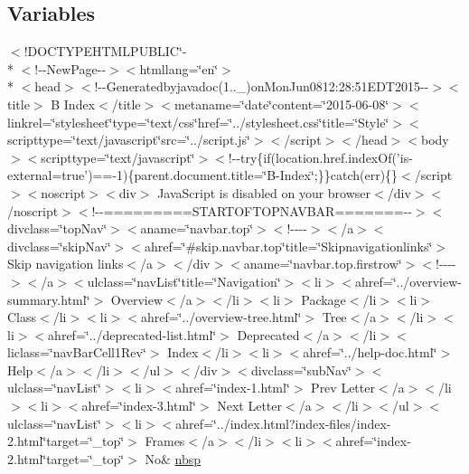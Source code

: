 \subsection*{Variables}
\begin{DoxyCompactItemize}
\item 
$<$!D\-O\-C\-T\-Y\-P\-E\-H\-T\-M\-L\-P\-U\-B\-L\-I\-C\char`\"{}-\/\\*
$<$!-\/-\/New\-Page-\/-\/$>$$<$htmllang=\char`\"{}en\char`\"{}$>$\\*
$<$head$>$$<$!-\/-\/Generatedbyjavadoc(1..\-\_)on\-Mon\-Jun0812\-:28\-:51\-E\-D\-T2015-\/-\/$>$$<$title$>$ B Index$<$/title$>$$<$metaname=\char`\"{}date\char`\"{}content=\char`\"{}2015-\/06-\/08\char`\"{}$>$$<$linkrel=\char`\"{}stylesheet\char`\"{}type=\char`\"{}text/css\char`\"{}href=\char`\"{}../stylesheet.\-css\char`\"{}title=\char`\"{}\-Style\char`\"{}$>$$<$scripttype=\char`\"{}text/javascript\char`\"{}src=\char`\"{}../script.\-js\char`\"{}$>$$<$/script$>$$<$/head$>$$<$body$>$$<$scripttype=\char`\"{}text/javascript\char`\"{}$>$$<$!-\/-\/try\{if(location.\-href.\-index\-Of('is-\/external=true')==-\/1)\{parent.\-document.\-title=\char`\"{}\-B-\/\-Index\char`\"{};\}\}catch(err)\{\}$<$/script$>$$<$noscript$>$$<$div$>$ Java\-Script is disabled on your browser$<$/div$>$$<$/noscript$>$$<$!-\/-\/=========\-S\-T\-A\-R\-T\-O\-F\-T\-O\-P\-N\-A\-V\-B\-A\-R=======-\/-\/$>$$<$divclass=\char`\"{}top\-Nav\char`\"{}$>$$<$aname=\char`\"{}navbar.\-top\char`\"{}$>$$<$!-\/-\/-\/-\/$>$$<$/a$>$$<$divclass=\char`\"{}skip\-Nav\char`\"{}$>$$<$ahref=\char`\"{}\#skip.\-navbar.\-top\char`\"{}title=\char`\"{}\-Skipnavigationlinks\char`\"{}$>$ Skip navigation links$<$/a$>$$<$/div$>$$<$aname=\char`\"{}navbar.\-top.\-firstrow\char`\"{}$>$$<$!-\/-\/-\/-\/$>$$<$/a$>$$<$ulclass=\char`\"{}nav\-List\char`\"{}title=\char`\"{}\-Navigation\char`\"{}$>$$<$li$>$$<$ahref=\char`\"{}../overview-\/summary.\-html\char`\"{}$>$ Overview$<$/a$>$$<$/li$>$$<$li$>$ Package$<$/li$>$$<$li$>$ Class$<$/li$>$$<$li$>$$<$ahref=\char`\"{}../overview-\/tree.\-html\char`\"{}$>$ Tree$<$/a$>$$<$/li$>$$<$li$>$$<$ahref=\char`\"{}../deprecated-\/list.\-html\char`\"{}$>$ Deprecated$<$/a$>$$<$/li$>$$<$liclass=\char`\"{}nav\-Bar\-Cell1\-Rev\char`\"{}$>$ Index$<$/li$>$$<$li$>$$<$ahref=\char`\"{}../help-\/doc.\-html\char`\"{}$>$ Help$<$/a$>$$<$/li$>$$<$/ul$>$$<$/div$>$$<$divclass=\char`\"{}sub\-Nav\char`\"{}$>$$<$ulclass=\char`\"{}nav\-List\char`\"{}$>$$<$li$>$$<$ahref=\char`\"{}index-\/1.\-html\char`\"{}$>$ Prev Letter$<$/a$>$$<$/li$>$$<$li$>$$<$ahref=\char`\"{}index-\/3.\-html\char`\"{}$>$ Next Letter$<$/a$>$$<$/li$>$$<$/ul$>$$<$ulclass=\char`\"{}nav\-List\char`\"{}$>$$<$li$>$$<$ahref=\char`\"{}../index.\-html?index-\/files/index-\/2.\-html\char`\"{}target=\char`\"{}\-\_\-top\char`\"{}$>$ Frames$<$/a$>$$<$/li$>$$<$li$>$$<$ahref=\char`\"{}index-\/2.\-html\char`\"{}target=\char`\"{}\-\_\-top\char`\"{}$>$ No\& \hyperlink{index-2_8html_a479d00f21dbca369efe3be97f1ef785a}{nbsp}
\end{DoxyCompactItemize}


